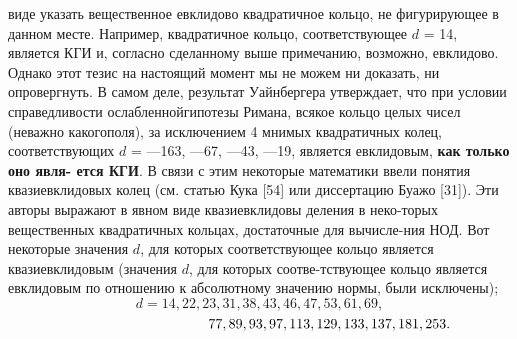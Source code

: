 виде указать вещественное евклидово квадратичное кольцо, не \linebreak фигурирующее в данном месте. Например, квадратичное кольцо, \linebreak соответствующее $d$ = 14, является КГИ и, согласно сделанному выше примечанию, возможно, евклидово. Однако этот тезис на настоящий момент
мы не можем ни доказать, ни опровергнуть. В самом деле, результат\linebreak
Уайнбергера утверждает, что при условии справедливости ослабленной\linebreak гипотезы Римана, всякое кольцо целых чисел (неважно какого\linebreak поля), за исключением 4 мнимых квадратичных колец, соответствующих\linebreak
$d$ = —163, —67, —43, —19, является евклидовым, \textbf{как только оно явля-\linebreak
ется КГИ}.\newline
\hspace*{10pt} В связи с этим некоторые математики ввели понятия квазиевклидовых колец (см. статью Кука [54] или диссертацию Буажо [31]). Эти\linebreak
авторы выражают в явном виде квазиевклидовы деления в неко-\linebreak торых вещественных квадратичных кольцах, достаточные для вычисле-\linebreak ния НОД. Вот некоторые значения $d$, для которых соответствующее
кольцо является квазиевклидовым (значения $d$, для которых соотве-\linebreak тствующее кольцо является евклидовым по отношению к абсолютному\linebreak
значению нормы, были исключены);
$$d = 14,22,23,31,38,43,46,47,53,61,69,$$
$$\hspace*{100pt}77,89,93,97,113,129,133,137,181,253.$$\linebreak\pagebreak


